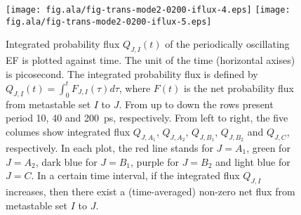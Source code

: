 \documentclass[aip,jcp,a4paper,preprint,onecolumn]{revtex4-1}
\begin{document}
\begin{figure}
  \texttt{[image: fig.ala/fig-trans-mode2-0200-iflux-4.eps]}
  \texttt{[image: fig.ala/fig-trans-mode2-0200-iflux-5.eps]}\\
  \caption{
    Integrated probability flux $Q_{J,I}(t)$ of the periodically
    oscillating EF is plotted against time. The unit of the
    time (horizontal axises) is picosecond.
    The integrated
    probability flux is defined by $Q_{J,I}(t) = \int_0^t F_{J,I}(\tau) d\tau$, where
    $F(t)$ is the net probability flux from metastable set $I$ to $J$.
    From up to down the rows present period 10, 40 and 200~ps, respectively.
    From left to right, the five
    columes show integrated flux $Q_{J,A_1}$, $Q_{J,A_2}$,
    $Q_{J,B_1}$, $Q_{J,B_2}$ and $Q_{J,C}$, respectively. In each plot,
    the red line stands for $J=A_1$, green for $J=A_2$, dark blue for $J=B_1$,
    purple for $J=B_2$ and light blue for $J=C$. In a certain time interval,
    if the integrated flux $Q_{J,I}$ increases, then there exist a (time-averaged)
    non-zero net flux from metastable set $I$ to $J$.
  }
  \label{fig:tmp10}
\end{figure}
\end{document}
